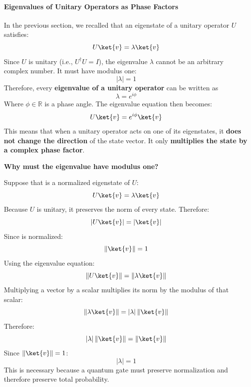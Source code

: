 \paragraph{Eigenvalues of Unitary Operators as Phase Factors}\label{ex:eigenvalues-of-unitary-operators-as-phase-factors}

In the previous section, we recalled that an eigenstate  of a unitary operator $U$ satisfies:
\begin{equation*}
    U\ket{v}=\lambda\ket{v}
\end{equation*}
Since $U$ is unitary (i.e., $U^\dagger U=I$), the eigenvalue $\lambda$ cannot be an arbitrary complex number. It must have modulus one:
\begin{equation*}
    \left|\lambda\right|=1
\end{equation*}
Therefore, every \textbf{eigenvalue of a unitary operator} can be written as
\begin{equation*}
    \lambda=e^{i\phi}
\end{equation*}
Where $\phi\in\mathbb{R}$ is a phase angle. The eigenvalue equation then becomes:
\begin{equation*}
    U\ket{v}=e^{i\phi}\ket{v}
\end{equation*}
This means that when a unitary operator acts on one of its eigenstates, it \textbf{does not change the direction} of the state vector. It only \textbf{multiplies the state by a complex phase factor}.

\highspace
\begin{flushleft}
    \textcolor{Green3}{ \textbf{Why must the eigenvalue have modulus one?}}
\end{flushleft}
Suppose that  is a normalized eigenstate of $U$:
\begin{equation*}
    U\ket{v}=\lambda\ket{v}
\end{equation*}
Because $U$ is unitary, it preserves the norm of every state. Therefore:
\begin{equation*}
    \left|U\ket{v}\right|=\left|\ket{v}\right|
\end{equation*}
Since  is normalized:
\begin{equation*}
    \left\|\ket{v}\right\| = 1
\end{equation*}
Using the eigenvalue equation:
\begin{equation*}
    \left\|U\ket{v}\right\| = \left\|\lambda\ket{v}\right\|
\end{equation*}
Multiplying a vector by a scalar multiplies its norm by the modulus of that scalar:
\begin{equation*}
    \left\|\lambda\ket{v}\right\| = \left|\lambda\right|\left\|\ket{v}\right\|
\end{equation*}
Therefore:
\begin{equation*}
    \left|\lambda\right| \left\|\ket{v}\right\| = \left\|\ket{v}\right\|
\end{equation*}
Since $\left\|\ket{v}\right\|=1$:
\begin{equation*}
    \left|\lambda\right| = 1
\end{equation*}
This is necessary because a quantum gate must preserve normalization and therefore preserve total probability.

